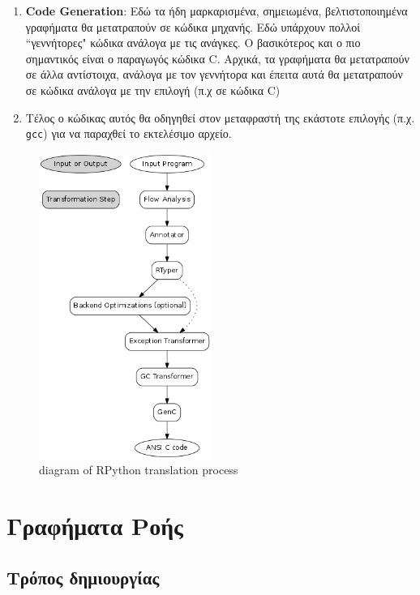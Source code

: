 \begin{enumerate}
\begin{itemize}
\end{itemize}

\item \textbf{Code Generation}: Εδώ τα ήδη μαρκαρισμένα, σημειωμένα,
βελτιστοποιημένα γραφήματα θα μετατραπούν σε κώδικα μηχανής. Εδώ υπάρχουν 
πολλοί ``γεννήτορες" κώδικα ανάλογα με τις ανάγκες. Ο βασικότερος και ο πιο 
σημαντικός είναι ο παραγωγός κώδικα C. Αρχικά, τα γραφήματα θα μετατραπούν σε 
άλλα αντίστοιχα, ανάλογα με τον γεννήτορα και έπειτα αυτά θα μετατραπούν σε
κώδικα ανάλογα με την επιλογή (π.χ σε κώδικα C)

\item Τέλος ο κώδικας αυτός θα οδηγηθεί στον μεταφραστή της εκάστοτε επιλογής
(π.χ. \texttt{gcc}) για να παραχθεί το εκτελέσιμο αρχείο.

\end{enumerate}

\begin{figure}[h]
\centering
\includegraphics[width=0.5\textwidth]{diagram.png}
\caption{diagram of RPython translation process}
\label{figure-1}
\end{figure}

\section{Γραφήματα Ροής}

\subsection{Τρόπος δημιουργίας}

